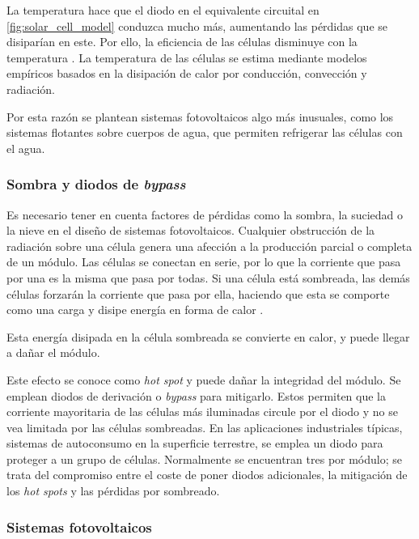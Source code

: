 La temperatura hace que el \gls{diodo} en el equivalente circuital en \ref{fig:solar_cell_model} conduzca mucho más, aumentando las pérdidas que se disiparían en este. Por ello, la eficiencia de las células disminuye con la temperatura \cite{Perpinan2020}. La temperatura de las células se estima mediante modelos empíricos basados en la disipación de calor por conducción, convección y radiación.

Por esta razón se plantean sistemas fotovoltaicos algo más inusuales, como los \gls{sistemas flotantes} sobre cuerpos de agua, que permiten refrigerar las células con el agua.

\subsubsection{Sombra y diodos de \textit{bypass}} \label{sssct:efecto-sombra}

Es necesario tener en cuenta factores de pérdidas como la \gls{sombra}, la suciedad o la nieve en el diseño de sistemas fotovoltaicos. Cualquier obstrucción de la radiación sobre una célula genera una afección a la producción parcial o completa de un \gls{módulo}. Las células se conectan en serie, por lo que la corriente que pasa por una es la misma que pasa por todas. Si una célula está sombreada, las demás células forzarán la corriente que pasa por ella, haciendo que esta se comporte como una \gls{carga} y disipe energía en forma de calor \cite{Perpinan2020}.

Esta energía disipada en la célula sombreada se convierte en calor, y puede llegar a dañar el módulo.

Este efecto se conoce como \textit{hot spot} y puede dañar la integridad del módulo. Se emplean diodos de derivación o \textit{bypass} para mitigarlo. Estos permiten que la corriente mayoritaria de las células más iluminadas circule por el \gls{diodo} y no se vea limitada por las células sombreadas. En las aplicaciones industriales típicas, sistemas de autoconsumo en la superficie terrestre, se emplea un \gls{diodo} para proteger a un grupo de células. Normalmente se encuentran tres por módulo; se trata del compromiso entre el coste de poner diodos adicionales, la mitigación de los \textit{hot spots} y las pérdidas por sombreado.

\subsubsection{Sistemas fotovoltaicos}

